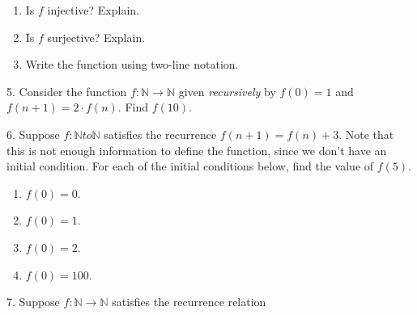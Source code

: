 \documentclass[10pt,]{book}
\theoremstyle{plain}
\theoremstyle{definition}
\theoremstyle{definition}
\numberwithin{equation}{chapter}
\newcommand{\N}{\mathbb N}
\begin{document}
\begin{exerciselist}
\begin{sidebyside}{1}{0.3}{0.3}{0}
\begin{sbspanel}{0.4}
\end{sbspanel}
\end{sidebyside}
\par
\hypertarget{p-689}{}%
\leavevmode%
\begin{enumerate}[label=(\alph*)]
\item\hypertarget{li-437}{}\hypertarget{p-690}{}%
Is \(f\) injective? Explain.%
\item\hypertarget{li-438}{}\hypertarget{p-691}{}%
Is \(f\) surjective? Explain.%
\item\hypertarget{li-439}{}\hypertarget{p-692}{}%
Write the function using two-line notation.%
\end{enumerate}
%
\par\smallskip
\item[5.]\hypertarget{exercise-51}{}\hypertarget{p-697}{}%
Consider the function \(f:\N \to \N\) given \emph{recursively} by \(f(0) = 1\) and \(f(n+1) = 2\cdot f(n)\).  Find \(f(10)\).%
\par\smallskip
\item[6.]\hypertarget{exercise-52}{}\hypertarget{p-699}{}%
Suppose \(f:\N to \N\) satisfies the recurrence \(f(n+1) = f(n) + 3\).  Note that this is not enough information to define the function, since we don't have an initial condition. For each of the initial conditions below, find the value of \(f(5)\). \leavevmode%
\begin{enumerate}[label=(\alph*)]
\item\hypertarget{li-443}{}\hypertarget{p-700}{}%
\(f(0) = 0\).%
\item\hypertarget{li-444}{}\hypertarget{p-701}{}%
\(f(0) = 1\).%
\item\hypertarget{li-445}{}\hypertarget{p-702}{}%
\(f(0) = 2\).%
\item\hypertarget{li-446}{}\hypertarget{p-703}{}%
\(f(0) = 100\).%
\end{enumerate}
%
\par\smallskip
\item[7.]\hypertarget{exercise-53}{}\hypertarget{p-709}{}%
Suppose \(f:\N \to \N\) satisfies the recurrence relation%

\end{exerciselist}
\end{document}
